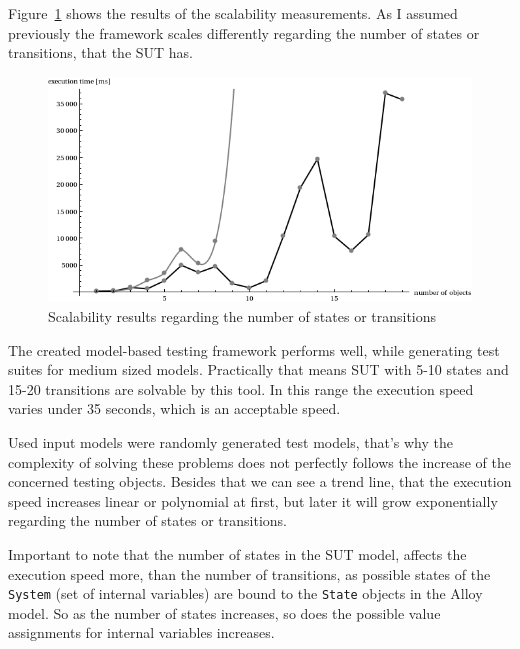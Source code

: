 Figure~\ref{fig:measurements_scalability} shows the results of the scalability measurements. As I assumed previously the framework scales differently regarding the number of states or transitions, that the SUT has.

\begin{figure}[htp]
\centering
\includegraphics[scale=0.5]{figures/measurements_scalability}
\caption{Scalability results regarding the number of states or transitions}
\label{fig:measurements_scalability}
\end{figure}

The created model-based testing framework performs well, while generating test suites for medium sized models. Practically that means SUT with 5-10 states and 15-20 transitions are solvable by this tool. In this range the execution speed varies under 35 seconds, which is an acceptable speed.

Used input models were randomly generated test models, that's why the complexity of solving these problems does not perfectly follows the increase of the concerned testing objects. Besides that we can see a trend line, that the execution speed increases linear or polynomial at first, but later it will grow exponentially regarding the number of states or transitions.

Important to note that the number of states in the SUT model, affects the execution speed more, than the number of transitions, as possible states of the \texttt{System} (set of internal variables) are bound to the \texttt{State} objects in the Alloy model. So as the number of states increases, so does the possible value assignments for internal variables increases.


